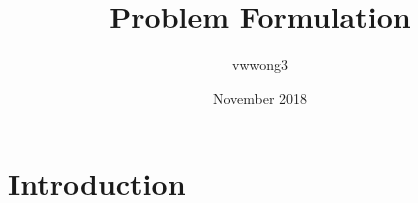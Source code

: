 \documentclass{article}
\title{Problem Formulation}
\author{vwwong3 }
\date{November 2018}
\begin{document}
\maketitle

\section{Introduction}
\end{document}
